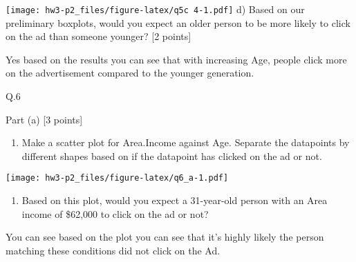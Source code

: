 \documentclass[
]{article}
\newenvironment{Shaded}{\begin{snugshade}}{\end{snugshade}}
\newcommand{\DataTypeTok}[1]{\textcolor[rgb]{0.13,0.29,0.53}{#1}}
\newcommand{\KeywordTok}[1]{\textcolor[rgb]{0.13,0.29,0.53}{\textbf{#1}}}
\newcommand{\NormalTok}[1]{#1}
\newcommand{\OperatorTok}[1]{\textcolor[rgb]{0.81,0.36,0.00}{\textbf{#1}}}
\newcommand{\StringTok}[1]{\textcolor[rgb]{0.31,0.60,0.02}{#1}}
\providecommand{\tightlist}{%
  \setlength{\itemsep}{0pt}\setlength{\parskip}{0pt}}
\begin{document}
\begin{Shaded}
\end{Shaded}

\texttt{[image: hw3-p2\_files/figure-latex/q5c 4-1.pdf]} d) Based on our
preliminary boxplots, would you expect an older person to be more likely
to click on the ad than someone younger? {[}2 points{]}

Yes based on the results you can see that with increasing Age, people
click more on the advertisement compared to the younger generation.

Q.6

Part (a) {[}3 points{]}

\begin{enumerate}
\def\labelenumi{\arabic{enumi}.}
\tightlist
\item
  Make a scatter plot for Area.Income against Age. Separate the
  datapoints by different shapes based on if the datapoint has clicked
  on the ad or not.
\end{enumerate}

\texttt{[image: hw3-p2\_files/figure-latex/q6\_a-1.pdf]}

\begin{enumerate}
\def\labelenumi{\arabic{enumi}.}
\setcounter{enumi}{1}
\tightlist
\item
  Based on this plot, would you expect a 31-year-old person with an Area
  income of \$62,000 to click on the ad or not?
\end{enumerate}

You can see based on the plot you can see that it's highly likely the
person matching these conditions did not click on the Ad.
\end{document}
